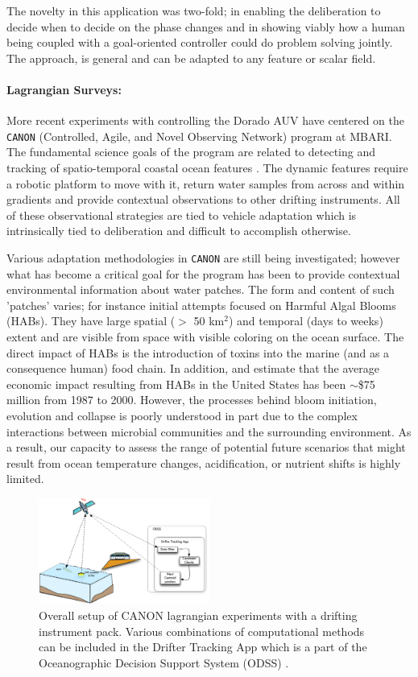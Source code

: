 The novelty in this application was two-fold; in enabling the
deliberation to decide when to decide on the phase changes and in
showing viably how a human being coupled with a goal-oriented
controller could do problem solving jointly. The approach, is general
and can be adapted to any feature or scalar field.

\paragraph {Lagrangian Surveys:} More recent experiments with \rx
controlling the Dorado AUV have centered on the \texttt{CANON}
(Controlled, Agile, and Novel Observing Network) program at MBARI. The
fundamental science goals of the program are related to detecting and
tracking of spatio-temporal coastal ocean features \cite{canon}. The
dynamic features require a robotic platform to move with it, return
water samples from across and within gradients and provide contextual
observations to other drifting instruments. All of these observational
strategies are tied to vehicle adaptation which is intrinsically tied
to deliberation and difficult to accomplish otherwise.

Various adaptation methodologies in \texttt{CANON} are still being
investigated; however what has become a critical goal for the program
has been to provide contextual environmental information about water
patches. The form and content of such 'patches' varies; for instance
initial attempts focused on Harmful Algal Blooms (HABs). They have
large spatial ($>$ 50 km$^2$) and temporal (days to weeks) extent and
are visible from space with visible coloring on the ocean surface. The
direct impact of HABs is the introduction of toxins into the marine
(and as a consequence human) food chain. In addition,
\cite{anderson00} and \cite{hoagland06} estimate that the average
economic impact resulting from HABs in the United States has been
$\sim$\$75 million from 1987 to 2000. However, the processes behind
bloom initiation, evolution and collapse is poorly understood in part
due to the complex interactions between microbial communities and the
surrounding environment. As a result, our capacity to assess the range
of potential future scenarios that might result from ocean temperature
changes, acidification, or nutrient shifts is highly limited.

\begin{figure}[htpb]
\centering
\includegraphics[width=0.5\textwidth]{figs/dta-app.pdf}
\caption{\small{Overall setup of CANON lagrangian experiments with a
    drifting instrument pack. Various combinations of computational
    methods can be included in the Drifter Tracking App which is a
    part of the Oceanographic Decision Support System (ODSS)
    \cite{das11}.}}
\label{fig:dta-setup}
\end{figure}

